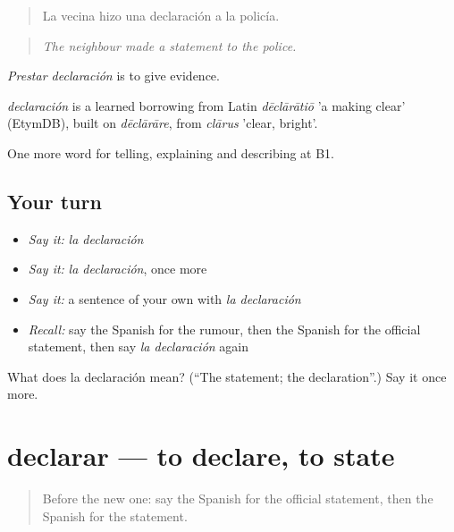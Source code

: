 \begin{quote}
La vecina hizo una declaración a la policía.
\end{quote}

\begin{quote}
\emph{The neighbour made a statement to the police.}
\end{quote}

\emph{Prestar declaración} is to give evidence.

\begin{cousinweb}
\emph{declaración} is a learned borrowing from Latin \emph{dēclārātiō} 'a making clear' (EtymDB), built on \emph{dēclārāre}, from \emph{clārus} 'clear, bright'.
\end{cousinweb}

\begin{grammarlens}[title={What you've built}]
One more word for telling, explaining and describing at B1.
\end{grammarlens}

\subsection*{Your turn}
\begin{itemize}
\raggedright
  \item \emph{Say it:} \emph{la declaración}
  \item \emph{Say it:} \emph{la declaración}, once more
  \item \emph{Say it:} a sentence of your own with \emph{la declaración}
  \item \emph{Recall:} say the Spanish for the rumour, then the Spanish for the official statement, then say \emph{la declaración} again
\end{itemize}

\begin{tcolorbox}[breakable,colback=teal!4,colframe=teal!35!black,title={Before you move on}]
What does la declaración mean? (\textquotedblleft{}The statement; the declaration\textquotedblright{}.) Say it once more.
\end{tcolorbox}
\section[declarar]{declarar — to declare, to state}

\label{lesson:ES-C515-declarar}



\begin{quote}
Before the new one: say the Spanish for the official statement, then the Spanish for the statement.
\end{quote}

